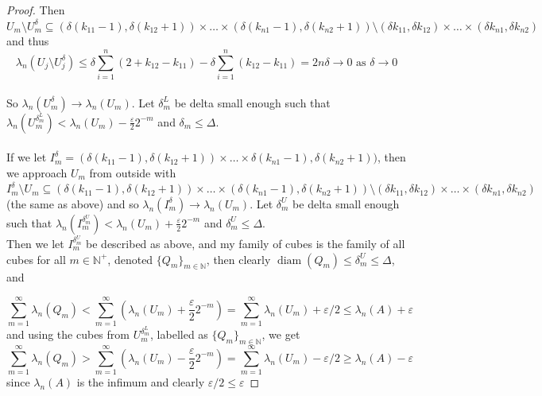 \documentclass{article}
\theoremstyle{plain}
\theoremstyle{definition}
\DeclareMathOperator{\diam}{diam}
\theoremstyle{remark}
\begin{document}
\begin{proof}
        
        
        
        
        
        Then $U_m \setminus U_m ^\delta \subseteq (\delta (k_{11}-1), \delta (k_{12} + 1)) \times  \dots \times  (\delta (k_{n1}-1), \delta (k_{n2} + 1)) \setminus (\delta k_{11}, \delta k_{12}) \times \dots \times (\delta k_{n1}, \delta k_{n2})$ and thus
        \[
        \lambda_n(U_j \setminus U_j^\delta ) \le \delta  \sum \limits _{i=1}^n (2+k_{12}-k_{11}) - \delta \sum \limits _{i=1}^n (k_{12} - k_{11}) = 2n\delta \to 0 \text{ as } \delta \to 0
        \]
    ~\\ 
        So $\lambda _n(U_m^\delta ) \to \lambda _n(U_m)$. Let $\delta^L _m$ be delta small enough such that $\lambda _n(U_m^{\delta_m^L})<\lambda_n(U_m) - \frac{\varepsilon}{2} 2^{-m}$ and $\delta _m \le \Delta$. \\ ~\\
        If we let $I_ {m} ^\delta= (\delta (k_{11}-1), \delta (k_{12} + 1)) \times  \dots \times  \delta (k_{n1}-1), \delta (k_{n2} + 1))$, then we approach $U_m$ from outside with $I^\delta _m \setminus U_m \subseteq (\delta (k_{11}-1), \delta (k_{12} + 1)) \times \dots \times (\delta (k_{n1}-1), \delta (k_{n2} + 1)) \setminus (\delta k_{11}, \delta k_{12}) \times \dots \times (\delta k_{n1}, \delta k_{n2})$ (the same as above) and so
        $\lambda _n(I_m^\delta) \to \lambda_n(U_m)$. Let $\delta^U _m$ be delta small enough such that $\lambda_n(I_m^{\delta^U_m})<\lambda_n(U_m) + \frac{\varepsilon}{2} 2^{-m}$ and $\delta^U _m \le \Delta$. \\ Then we let $I_m^{\delta_m^U}$ be described as above, and my family of cubes is the family of all cubes for all $m\in \mathbb{N}^+ $, denoted $\{Q_m\}_{m \in \mathbb{N}}$, then clearly $\diam (Q_m)\le \delta_m^U \le \Delta$, and 
        
        \[
        \sum \limits _{m=1}^\infty \lambda_n(Q_m)<\sum \limits _{m=1}^\infty(\lambda_n (U_m) + \frac{\varepsilon}{2}2^{-m}) = \sum \limits _{m=1}^\infty\lambda_n (U_m) + \varepsilon/2 \le \lambda_n(A) + \varepsilon 
        \]
        and using the cubes from $U_m^{\delta_m^L}$, labelled as $\{Q_m\}_{m\in \mathbb{N}}$, we get
        \[
        \sum \limits _{m=1}^\infty \lambda_n(Q_m)>\sum \limits _{m=1}^\infty(\lambda_n (U_m) - \frac{\varepsilon}{2}2^{-m}) = \sum \limits _{m=1}^\infty\lambda_n (U_m) - \varepsilon/2 \ge \lambda_n(A) - \varepsilon
        \]
        since $\lambda_n(A)$ is the infimum and clearly $\varepsilon/2 \le \varepsilon$

    
\end{proof}
\end{document}
